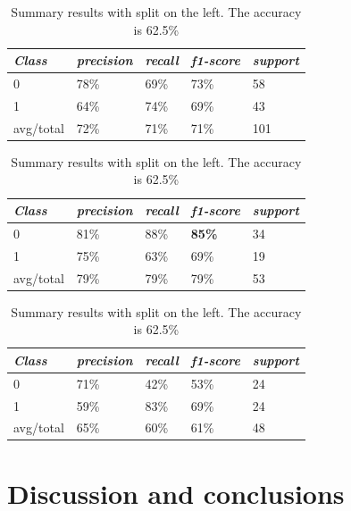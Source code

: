 \documentclass[authoryear]{elsarticle}
\begin{document}
\begin{table}[htbh]
\center
\caption{\small{Summary results with no split. The accuracy is 71.3\%}}
\label{my-label}
\begin{tabular}{lllll}

\textit{Class} & \textit{precision} & \textit{recall} & \textit{f1-score} & \textit{support} \\ \hline
0         & 78\%      & 69\%   & 73\%     & 58      \\
1         & 64\%      & 74\%   & 69\%     & 43      \\ \hline
avg/total & 72\%      & 71\%   & 71\%     & 101     \\ \hline
\end{tabular}
\caption{\small{Summary results with split on the right. The accuracy is 79.2\%}}
\label{my-label}
\begin{tabular}{lllll}

\textit{Class} & \textit{precision} & \textit{recall} & \textit{f1-score} & \textit{support} \\ \hline
0         & 81\%      & 88\%   & \textbf{85\%}     & 34      \\
1         & 75\%      & 63\%   & 69\%     & 19      \\ \hline
avg/total & 79\%      & 79\%   & 79\%     & 53     \\ \hline
\end{tabular}
\caption{\small{Summary results with split on the left. The accuracy is 62.5\%}}
\label{my-label}
\begin{tabular}{lllll}

\textit{Class} & \textit{precision} & \textit{recall} & \textit{f1-score} & \textit{support} \\ \hline
0         & 71\%      & 42\%   & 53\%     & 24      \\
1         & 59\%      & 83\%   & 69\%     & 24      \\ \hline
avg/total & 65\%      & 60\%   & 61\%     & 48     \\ \hline
\end{tabular}
\end{table}




\section{Discussion and conclusions}
\end{document}
